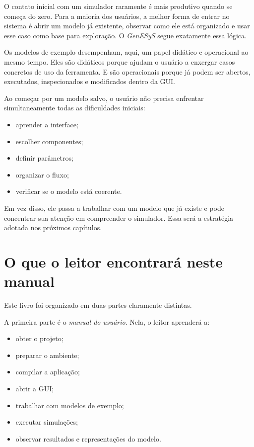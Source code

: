 O contato inicial com um simulador raramente é mais produtivo quando se começa do zero. Para a maioria dos usuários, a melhor forma de entrar no sistema é abrir um modelo já existente, observar como ele está organizado e usar esse caso como base para exploração. O \textit{GenESyS} segue exatamente essa lógica.

Os modelos de exemplo desempenham, aqui, um papel didático e operacional ao mesmo tempo. Eles são didáticos porque ajudam o usuário a enxergar casos concretos de uso da ferramenta. E são operacionais porque já podem ser abertos, executados, inspecionados e modificados dentro da GUI.

Ao começar por um modelo salvo, o usuário não precisa enfrentar simultaneamente todas as dificuldades iniciais:
\begin{itemize}
    \item aprender a interface;
    \item escolher componentes;
    \item definir parâmetros;
    \item organizar o fluxo;
    \item verificar se o modelo está coerente.
\end{itemize}

Em vez disso, ele passa a trabalhar com um modelo que já existe e pode concentrar sua atenção em compreender o simulador. Essa será a estratégia adotada nos próximos capítulos.

\section{O que o leitor encontrará neste manual}
\label{sec:cap1_o_que_o_leitor_encontrara}

Este livro foi organizado em duas partes claramente distintas.

A primeira parte é o \textit{manual do usuário}. Nela, o leitor aprenderá a:
\begin{itemize}
    \item obter o projeto;
    \item preparar o ambiente;
    \item compilar a aplicação;
    \item abrir a GUI;
    \item trabalhar com modelos de exemplo;
    \item executar simulações;
    \item observar resultados e representações do modelo.
\end{itemize}

